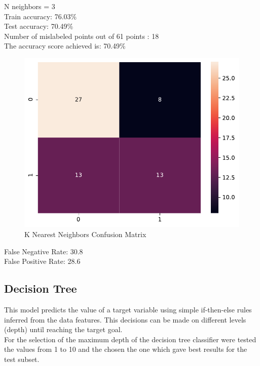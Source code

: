 \documentclass[conference]{IEEEtran}
\begin{document}
\noindent
N neighbors = 3
\\Train accuracy: 76.03\%
\\Test accuracy: 70.49\%
\\[\baselineskip]
Number of mislabeled points out of 61 points : 18
\\The accuracy score achieved is: 70.49\%

\begin{figure}[H]
    \centerline{\includegraphics[width=0.8\linewidth]{images/k_nearest_neighbors_cm.pdf}}
    \caption{K Nearest Neighbors Confusion Matrix}
    \label{knn_cm}
\end{figure}

\noindent
False Negative Rate: 30.8
\\False Positive Rate: 28.6
\newpage

\subsection{Decision Tree}
This model predicts the value of a target variable using simple if-then-else rules inferred from the data features. This decisions can be made on different levels (depth) until reaching the target goal.
\\For the selection of the maximum depth of the decision tree classifier were tested the values from 1 to 10 and the chosen the one which gave best results for the test subset.
\end{document}
